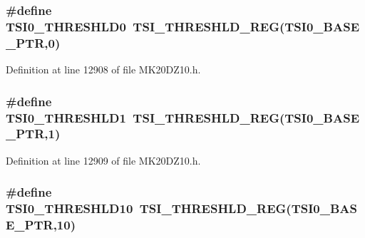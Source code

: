 \subsubsection[{\texorpdfstring{T\+S\+I0\+\_\+\+T\+H\+R\+E\+S\+H\+L\+D0}{TSI0_THRESHLD0}}]{\setlength{\rightskip}{0pt plus 5cm}\#define T\+S\+I0\+\_\+\+T\+H\+R\+E\+S\+H\+L\+D0~{\bf T\+S\+I\+\_\+\+T\+H\+R\+E\+S\+H\+L\+D\+\_\+\+R\+EG}({\bf T\+S\+I0\+\_\+\+B\+A\+S\+E\+\_\+\+P\+TR},0)}\hypertarget{group___t_s_i___register___accessor___macros_ga3d769bc382d44486f89762d75c0fe4b5}{}\label{group___t_s_i___register___accessor___macros_ga3d769bc382d44486f89762d75c0fe4b5}


Definition at line 12908 of file M\+K20\+D\+Z10.\+h.

\subsubsection[{\texorpdfstring{T\+S\+I0\+\_\+\+T\+H\+R\+E\+S\+H\+L\+D1}{TSI0_THRESHLD1}}]{\setlength{\rightskip}{0pt plus 5cm}\#define T\+S\+I0\+\_\+\+T\+H\+R\+E\+S\+H\+L\+D1~{\bf T\+S\+I\+\_\+\+T\+H\+R\+E\+S\+H\+L\+D\+\_\+\+R\+EG}({\bf T\+S\+I0\+\_\+\+B\+A\+S\+E\+\_\+\+P\+TR},1)}\hypertarget{group___t_s_i___register___accessor___macros_ga1dec80e1aa704ebe64cae66559377d14}{}\label{group___t_s_i___register___accessor___macros_ga1dec80e1aa704ebe64cae66559377d14}


Definition at line 12909 of file M\+K20\+D\+Z10.\+h.

\subsubsection[{\texorpdfstring{T\+S\+I0\+\_\+\+T\+H\+R\+E\+S\+H\+L\+D10}{TSI0_THRESHLD10}}]{\setlength{\rightskip}{0pt plus 5cm}\#define T\+S\+I0\+\_\+\+T\+H\+R\+E\+S\+H\+L\+D10~{\bf T\+S\+I\+\_\+\+T\+H\+R\+E\+S\+H\+L\+D\+\_\+\+R\+EG}({\bf T\+S\+I0\+\_\+\+B\+A\+S\+E\+\_\+\+P\+TR},10)}\hypertarget{group___t_s_i___register___accessor___macros_gaa9b6246ae32c00c9d436815d77f7f881}{}\label{group___t_s_i___register___accessor___macros_gaa9b6246ae32c00c9d436815d77f7f881}


